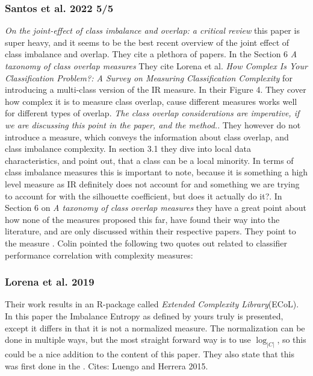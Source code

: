 \subsubsection*{Santos et al. 2022 5/5} \emph{On the joint-effect of class imbalance and overlap: a critical review} \cite{santos2022joint} this paper is super heavy, and it seems to be the best recent overview of the joint effect of class imbalance and overlap. They cite a plethora of papers. In the Section 6 \emph{A taxonomy of class overlap measures} They cite Lorena et al. \emph{How Complex Is Your Classification Problem?: {A} Survey on Measuring Classification Complexity} \cite{DBLP:journals/csur/LorenaGLSH19} for introducing a multi-class version of the IR measure. In their Figure 4. They cover how complex it is to measure class overlap, cause different measures works well for different types of overlap. \emph{The class overlap considerations are imperative, if we are discussing this point in the paper, and the method.}. They however do not introduce a measure, which conveys the information about class overlap, and class imbalance complexity. In section 3.1 they dive into local data characteristics, and point out, that a class can be a local minority. In terms of class imbalance measures this is important to note, because it is something a high level measure as IR definitely does not account for and something we are trying to account for with the silhouette coefficient, but does it actually do it?. In Section 6 on \emph{A taxonomy of class overlap measures} they have a great point about how none of the measures proposed this far, have found their way into the literature, and are only discussed within their respective papers. They point to the measure \cite{DBLP:conf/ida/MercierSASSS18}. 
Colin pointed the following two quotes out related to classifier performance correlation with complexity measures: 



\subsubsection*{Lorena et al. 2019}
Their work results in an R-package called \emph{Extended Complexity Library}(ECoL). In this paper the Imbalance Entropy as defined by yours truly is presented, except it differs in that it is not a normalized measure. The normalization can be done in multiple ways, but the most straight forward way is to use $\log_{|C|}$, so this could be a nice addition to the content of this paper. They also state that this was first done in the \cite{DBLP:journals/ijon/LorenaCSS12}. 
Cites: Luengo and Herrera 2015. 

